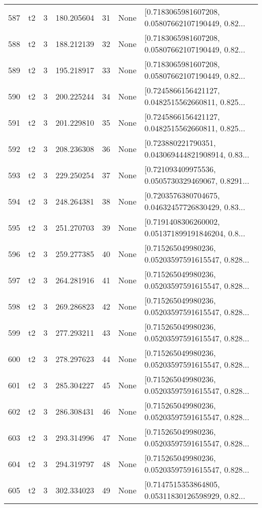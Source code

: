 \begin{tabular}{lllrlll}
587 &  t2 &   3 &   180.205604 &   31 &  None &  [0.7183065981607208, 0.05807662107190449, 0.82... \\
588 &  t2 &   3 &   188.212139 &   32 &  None &  [0.7183065981607208, 0.05807662107190449, 0.82... \\
589 &  t2 &   3 &   195.218917 &   33 &  None &  [0.7183065981607208, 0.05807662107190449, 0.82... \\
590 &  t2 &   3 &   200.225244 &   34 &  None &  [0.7245866156421127, 0.0482515562660811, 0.825... \\
591 &  t2 &   3 &   201.229810 &   35 &  None &  [0.7245866156421127, 0.0482515562660811, 0.825... \\
592 &  t2 &   3 &   208.236308 &   36 &  None &  [0.723880221790351, 0.043069444821908914, 0.83... \\
593 &  t2 &   3 &   229.250254 &   37 &  None &  [0.721093409975536, 0.0505730329469067, 0.8291... \\
594 &  t2 &   3 &   248.264381 &   38 &  None &  [0.7203576380704675, 0.04632457726830429, 0.83... \\
595 &  t2 &   3 &   251.270703 &   39 &  None &  [0.7191408306260002, 0.051371899191846204, 0.8... \\
596 &  t2 &   3 &   259.277385 &   40 &  None &  [0.715265049980236, 0.05203597591615547, 0.828... \\
597 &  t2 &   3 &   264.281916 &   41 &  None &  [0.715265049980236, 0.05203597591615547, 0.828... \\
598 &  t2 &   3 &   269.286823 &   42 &  None &  [0.715265049980236, 0.05203597591615547, 0.828... \\
599 &  t2 &   3 &   277.293211 &   43 &  None &  [0.715265049980236, 0.05203597591615547, 0.828... \\
600 &  t2 &   3 &   278.297623 &   44 &  None &  [0.715265049980236, 0.05203597591615547, 0.828... \\
601 &  t2 &   3 &   285.304227 &   45 &  None &  [0.715265049980236, 0.05203597591615547, 0.828... \\
602 &  t2 &   3 &   286.308431 &   46 &  None &  [0.715265049980236, 0.05203597591615547, 0.828... \\
603 &  t2 &   3 &   293.314996 &   47 &  None &  [0.715265049980236, 0.05203597591615547, 0.828... \\
604 &  t2 &   3 &   294.319797 &   48 &  None &  [0.715265049980236, 0.05203597591615547, 0.828... \\
605 &  t2 &   3 &   302.334023 &   49 &  None &  [0.7147515353864805, 0.05311830126598929, 0.82... \\

\end{tabular}
